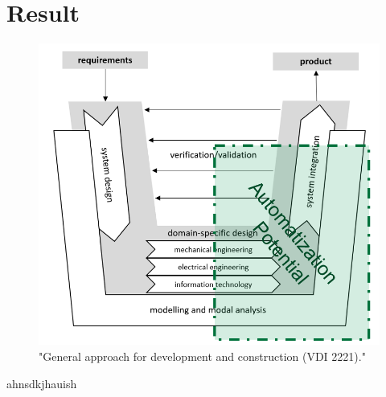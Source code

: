 \section{Result}

\begin{figure}[h]
    \centering
    \includegraphics[scale=0.5]{pics/VDI_2206.PNG}
    \caption{\label{pic:VDI2206} "General approach for development and construction (VDI 2221)." \cite{Jansch2006THEDO}}
\end{figure}

ahnsdkjhauish